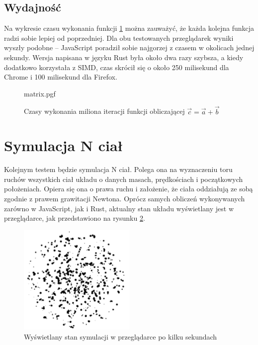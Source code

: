 \documentclass[language=polish,type=master]{aghmodern}
\begin{document}
\subsection{Wydajność}
Na wykresie czasu wykonania funkcji \ref{fig:matrix} można zauważyć, że każda kolejna funkcja radzi sobie lepiej od poprzedniej.
Dla obu testowanych przeglądarek wyniki wyszły podobne -- JavaScript poradził sobie najgorzej z czasem w okolicach jednej sekundy.
Wersja napisana w języku Rust była około dwa razy szybsza, a kiedy dodatkowo korzystała z SIMD, czas skrócił się o około 250 milisekund dla Chrome i 100 milisekund dla Firefox.

\begin{figure}[H]
    \centering
    {matrix.pgf}
    \caption{Czasy wykonania miliona iteracji funkcji obliczającej $\vec{c} = \vec{a} + \vec{b}$}
    \label{fig:matrix}
\end{figure}

\section{Symulacja N ciał}
Kolejnym testem będzie symulacja N ciał.
Polega ona na wyznaczeniu toru ruchów wszystkich ciał układu o danych masach, prędkościach i początkowych położeniach.
Opiera się ona o prawa ruchu i założenie, że ciała oddziałują ze sobą zgodnie z prawem grawitacji Newtona.
Oprócz samych obliczeń wykonywanych zarówno w JavaScript, jak i Rust, aktualny stan układu wyświetlany jest w przeglądarce, jak przedstawiono na rysunku \ref{fig:nbody_screenshot}.

\begin{figure}[H]
    \centering
    \vspace*{60pt}
    \includegraphics[width=0.5\textwidth]{images/nbody.pdf}
    \vspace*{15pt}
    \caption{Wyświetlany stan symulacji w przeglądarce po kilku sekundach}
    \label{fig:nbody_screenshot}
\end{figure}
\end{document}
